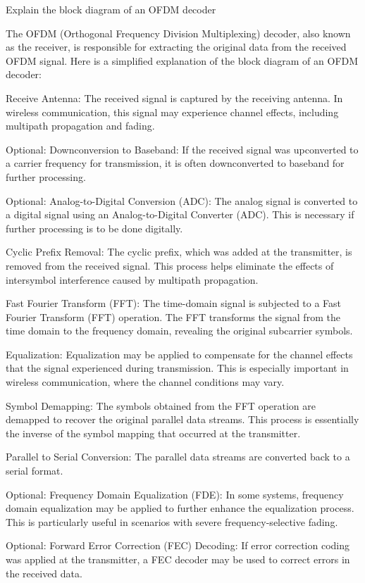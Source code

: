 Explain the block diagram of an OFDM decoder

The OFDM (Orthogonal Frequency Division Multiplexing) decoder, also known as the receiver, is responsible for extracting the original data from the received OFDM signal. Here is a simplified explanation of the block diagram of an OFDM decoder:

Receive Antenna:
The received signal is captured by the receiving antenna. In wireless communication, this signal may experience channel effects, including multipath propagation and fading.

Optional: Downconversion to Baseband:
If the received signal was upconverted to a carrier frequency for transmission, it is often downconverted to baseband for further processing.

Optional: Analog-to-Digital Conversion (ADC):
The analog signal is converted to a digital signal using an Analog-to-Digital Converter (ADC). This is necessary if further processing is to be done digitally.

Cyclic Prefix Removal:
The cyclic prefix, which was added at the transmitter, is removed from the received signal. This process helps eliminate the effects of intersymbol interference caused by multipath propagation.

Fast Fourier Transform (FFT):
The time-domain signal is subjected to a Fast Fourier Transform (FFT) operation. The FFT transforms the signal from the time domain to the frequency domain, revealing the original subcarrier symbols.

Equalization:
Equalization may be applied to compensate for the channel effects that the signal experienced during transmission. This is especially important in wireless communication, where the channel conditions may vary.

Symbol Demapping:
The symbols obtained from the FFT operation are demapped to recover the original parallel data streams. This process is essentially the inverse of the symbol mapping that occurred at the transmitter.

Parallel to Serial Conversion:
The parallel data streams are converted back to a serial format.

Optional: Frequency Domain Equalization (FDE):
In some systems, frequency domain equalization may be applied to further enhance the equalization process. This is particularly useful in scenarios with severe frequency-selective fading.

Optional: Forward Error Correction (FEC) Decoding:
If error correction coding was applied at the transmitter, a FEC decoder may be used to correct errors in the received data.

